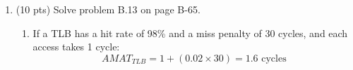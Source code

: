 \begin{enumerate}
    \item (10 pts) Solve problem B.13 on page B-65.
    \begin{enumerate}
        \item If a TLB has a hit rate of 98\% and a miss penalty of 30 cycles, and each access takes 1 cycle:
        \begin{equation}
        AMAT_{TLB} = 1 + (0.02 \times 30) = 1.6 \text{ cycles}
        \end{equation}
    \end{enumerate}
    
\end{enumerate}
